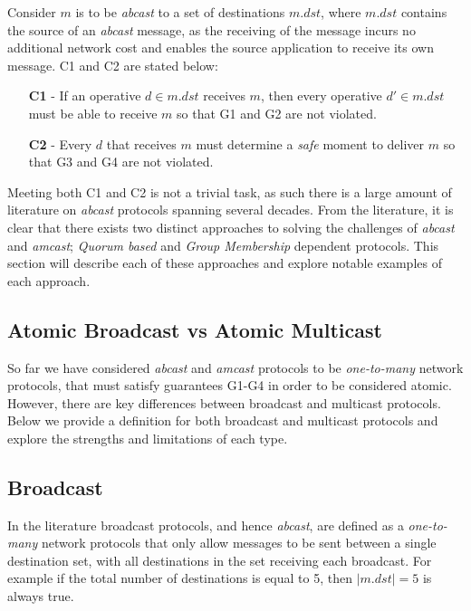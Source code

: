 Consider $m$ is to be \emph{abcast} to a set of destinations $m.dst$, where $m.dst$ contains the source of an \emph{abcast} message, as the receiving of the message incurs no additional network cost and enables the source application to receive its own message.  C1 and C2 are stated below:
\begin{itemize}
    \item[\textbf{C1}] - If an operative $d \in m.dst$ receives $m$, then every operative
     $d' \in m.dst$ must be able to receive $m$ so that G1 and G2 are not violated.
    \item[\textbf{C2}] - Every $d$ that receives $m$ must determine a \emph{safe} moment
to deliver $m$ so that G3 and G4 are not violated.
\end{itemize}

Meeting both C1 and C2 is not a trivial task, as such there is a large amount of literature\cite{Defago:2004:TOB:1041680.1041682} on \emph{abcast} protocols spanning several decades.  From the literature, it is clear that there exists two distinct approaches to solving the challenges of \emph{abcast} and \emph{amcast}; \emph{Quorum based} and \emph{Group Membership} dependent protocols.  This section will describe each of these approaches and explore notable examples of each approach.  
	
	\subsection{Atomic Broadcast vs Atomic Multicast}
	So far we have considered \emph{abcast} and \emph{amcast} protocols to be \emph{one-to-many} network protocols, that must satisfy guarantees G1-G4 in order to be considered atomic.  However, there are key differences between broadcast and multicast protocols.  Below we provide a definition for both broadcast and multicast protocols and explore the strengths and limitations of each type.  
	
	\subsection{Broadcast}\label{ssec:atomic_broadcast}
	In the literature\cite{Defago:2004:TOB:1041680.1041682} broadcast protocols, and hence \emph{abcast}, are defined as a \emph{one-to-many} network protocols that only allow messages to be sent between a single destination set, with all destinations in the set receiving each broadcast.  For example if the total number of destinations is equal to 5, then $\left\vert{m.dst}\right\vert = 5$ is always true.
	
